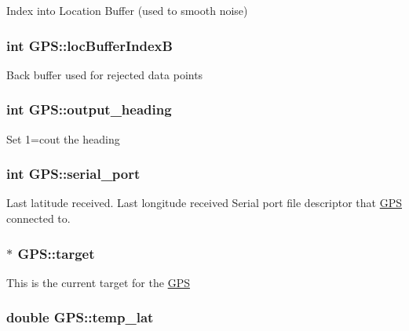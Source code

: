 Index into Location Buffer (used to smooth noise) \hypertarget{classGPS_ac85c17369384b4f9ddb0d0358df9d1cf}{
\subsubsection[{loc\-Buffer\-Index\-B}]{\setlength{\rightskip}{0pt plus 5cm}int G\-P\-S\-::loc\-Buffer\-Index\-B\hspace{0.3cm}{\ttfamily [protected]}}}\label{classGPS_ac85c17369384b4f9ddb0d0358df9d1cf}
Back buffer used for rejected data points \hypertarget{classGPS_a14c36e0dcc27dfa5e1381b9a4b25c2ce}{
\subsubsection[{output\-\_\-heading}]{\setlength{\rightskip}{0pt plus 5cm}int G\-P\-S\-::output\-\_\-heading\hspace{0.3cm}{\ttfamily [protected]}}}\label{classGPS_a14c36e0dcc27dfa5e1381b9a4b25c2ce}
Set 1=cout the heading \hypertarget{classGPS_a62ebacee895a13c211bfd372b818b680}{
\subsubsection[{serial\-\_\-port}]{\setlength{\rightskip}{0pt plus 5cm}int G\-P\-S\-::serial\-\_\-port\hspace{0.3cm}{\ttfamily [protected]}}}\label{classGPS_a62ebacee895a13c211bfd372b818b680}
Last latitude received. Last longitude received Serial port file descriptor that \hyperlink{classGPS}{G\-P\-S} connected to. \hypertarget{classGPS_a9deda2a96578019d9512a8ec74a93191}{
\subsubsection[{target}]{$\ast$ G\-P\-S\-::target\hspace{0.3cm}{\ttfamily [protected]}}}\label{classGPS_a9deda2a96578019d9512a8ec74a93191}
This is the current target for the \hyperlink{classGPS}{G\-P\-S} \hypertarget{classGPS_aa0e370ef448d131c54e3b1d626576cd2}{
\subsubsection[{temp\-\_\-lat}]{\setlength{\rightskip}{0pt plus 5cm}double G\-P\-S\-::temp\-\_\-lat\hspace{0.3cm}{\ttfamily [protected]}}}\label{classGPS_aa0e370ef448d131c54e3b1d626576cd2}
